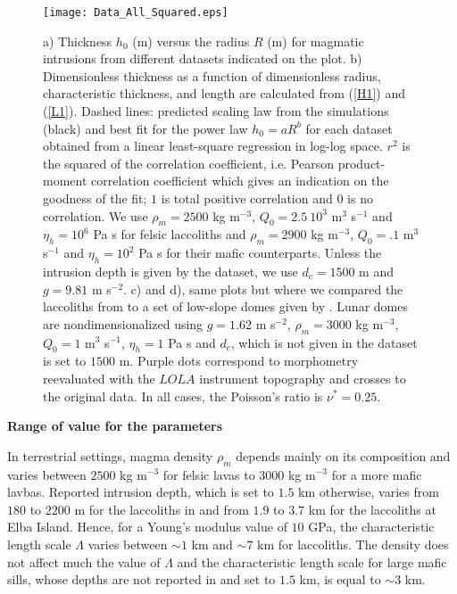 \begin{figure}[htpb]
  \begin{center}
    \graphicspath{ {/Users/thorey/Documents/These/Projet/Refroidissement/Skin_Model/Figure/Figure_Data/} }
    \texttt{[image: Data\_All\_Squared.eps]}
    \caption{a)  Thickness $h_0$  (m) versus  the radius  $R$ (m)  for
      magmatic  intrusions from  different datasets  indicated on  the
      plot. b) Dimensionless thickness  as a function of dimensionless
      radius, characteristic thickness, and length are calculated from
      (\ref{H1}) and (\ref{L1}).  Dashed  lines: predicted scaling law
      from  the simulations  (black) and  best fit  for the  power law
      $h_0=aR^b$ for each dataset  obtained from a linear least-square
      regression  in  log-log space.   $r^2$  is  the squared  of  the
      correlation coefficient, i.e. Pearson product-moment correlation
      coefficient which  gives an  indication on  the goodness  of the
      fit;  $1$   is  total  positive   correlation  and  $0$   is  no
      correlation.  We use $\rho_m=2500$  kg m$^{-3}$, $Q_0 =2.5~10^3$
      m$^3$ s$^{-1}$ and $\eta_h=10^6$ Pa  s for felsic laccoliths and
      $\rho_m=2900$  kg   m$^{-3}$,  $Q_0  =.1$  m$^3$   s$^{-1}$  and
      $\eta_h=10^2$  Pa s  for their  mafic counterparts.   Unless the
      intrusion depth is given by the dataset, we use $d_c=1500$ m and
      $g=9.81$  m  s$^{-2}$.  c)  and  d),  same  plots but  where  we
      compared the  laccoliths from \citep{Rocchi:2002jy} to  a set of
      low-slope domes given by \citet{Wohler:2009jj}.  Lunar domes are
      nondimensionalized using  $g=1.62$ m s$^{-2}$,  $\rho_m=3000$ kg
      m$^{-3}$, $Q_0  =1$ m$^3$ s$^{-1}$,  $\eta_h=1$ Pa s  and $d_c$,
      which is  not given in  the dataset is  set to $1500$  m. Purple
      dots  correspond  to  morphometry reevaluated  with  the  $LOLA$
      instrument topography and  crosses to the original  data. In all
      cases, the Poisson's ratio is $\nu^*=0.25$.}
    \label{Corry_Rocchie}
  \end{center}
\end{figure}



\vspace{.5cm} \textbf{Range of value for the parameters} \vspace{.5cm}

In terrestrial settings, magma density  $\rho_m$ depends mainly on its
composition and varies between $ 2500$ kg m$^{-3}$ for felsic lavas to
$3000$ kg m$^{-3}$ for a more mafic lavbas.  Reported intrusion depth,
which is set to $1.5$ km otherwise,  varies from $180$ to $2200$ m for
the laccoliths in \citet{E:2015tl} and from  $1.9$ to $3.7$ km for the
laccoliths at Elba Island.  Hence, for a Young's modulus value of $10$
GPa, the characteristic length scale $\Lambda$ varies between $\sim 1$
km and $\sim  7$ km for laccoliths.  The density  does not affect much
the value of  $\Lambda$ and the characteristic length  scale for large
mafic sills,  whose depths are  not reported in  \citet{Cruden:tg} and
set to $1.5$ km, is equal to $\sim 3$ km.

